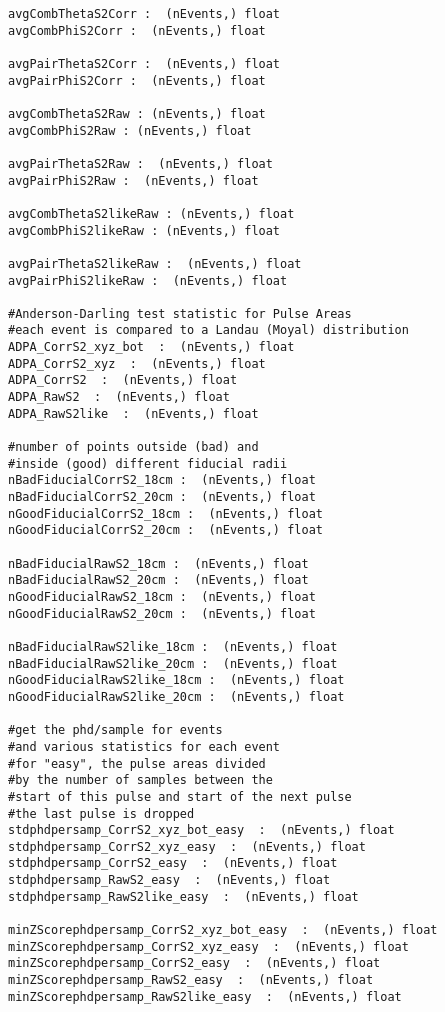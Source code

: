 \begin{Verbatim}[fontsize=\footnotesize]
avgCombThetaS2Corr :  (nEvents,) float 
avgCombPhiS2Corr :  (nEvents,) float 

avgPairThetaS2Corr :  (nEvents,) float 
avgPairPhiS2Corr :  (nEvents,) float 

avgCombThetaS2Raw : (nEvents,) float
avgCombPhiS2Raw : (nEvents,) float

avgPairThetaS2Raw :  (nEvents,) float
avgPairPhiS2Raw :  (nEvents,) float

avgCombThetaS2likeRaw : (nEvents,) float
avgCombPhiS2likeRaw : (nEvents,) float

avgPairThetaS2likeRaw :  (nEvents,) float
avgPairPhiS2likeRaw :  (nEvents,) float

#Anderson-Darling test statistic for Pulse Areas
#each event is compared to a Landau (Moyal) distribution
ADPA_CorrS2_xyz_bot  :  (nEvents,) float
ADPA_CorrS2_xyz  :  (nEvents,) float
ADPA_CorrS2  :  (nEvents,) float
ADPA_RawS2  :  (nEvents,) float
ADPA_RawS2like  :  (nEvents,) float

#number of points outside (bad) and 
#inside (good) different fiducial radii
nBadFiducialCorrS2_18cm :  (nEvents,) float
nBadFiducialCorrS2_20cm :  (nEvents,) float
nGoodFiducialCorrS2_18cm :  (nEvents,) float
nGoodFiducialCorrS2_20cm :  (nEvents,) float

nBadFiducialRawS2_18cm :  (nEvents,) float
nBadFiducialRawS2_20cm :  (nEvents,) float
nGoodFiducialRawS2_18cm :  (nEvents,) float
nGoodFiducialRawS2_20cm :  (nEvents,) float

nBadFiducialRawS2like_18cm :  (nEvents,) float
nBadFiducialRawS2like_20cm :  (nEvents,) float
nGoodFiducialRawS2like_18cm :  (nEvents,) float
nGoodFiducialRawS2like_20cm :  (nEvents,) float

#get the phd/sample for events 
#and various statistics for each event
#for "easy", the pulse areas divided 
#by the number of samples between the 
#start of this pulse and start of the next pulse
#the last pulse is dropped
stdphdpersamp_CorrS2_xyz_bot_easy  :  (nEvents,) float
stdphdpersamp_CorrS2_xyz_easy  :  (nEvents,) float
stdphdpersamp_CorrS2_easy  :  (nEvents,) float
stdphdpersamp_RawS2_easy  :  (nEvents,) float
stdphdpersamp_RawS2like_easy  :  (nEvents,) float

minZScorephdpersamp_CorrS2_xyz_bot_easy  :  (nEvents,) float
minZScorephdpersamp_CorrS2_xyz_easy  :  (nEvents,) float
minZScorephdpersamp_CorrS2_easy  :  (nEvents,) float
minZScorephdpersamp_RawS2_easy  :  (nEvents,) float
minZScorephdpersamp_RawS2like_easy  :  (nEvents,) float


\end{Verbatim}
